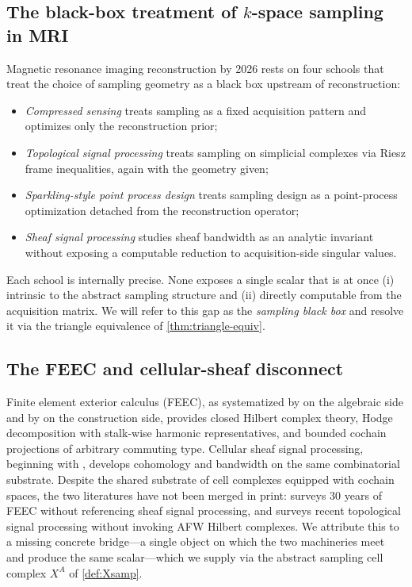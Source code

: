 \subsection{The black-box treatment of $k$-space sampling in MRI}\label{subsec:intro-mri-blackbox}

Magnetic resonance imaging reconstruction by 2026 rests on four
schools that treat the choice of sampling geometry as a black box
upstream of reconstruction:
\begin{itemize}[leftmargin=*]
\item \emph{Compressed sensing} \cite{LustigDonohoPauly2007} treats
  sampling as a fixed acquisition pattern and optimizes only the
  reconstruction prior;
\item \emph{Topological signal processing}
  \cite{BarbarossaSardellitti2020} treats sampling on simplicial
  complexes via Riesz frame inequalities, again with the geometry
  given;
\item \emph{Sparkling-style point process design}
  \cite{LazarusEtAl2019Sparkling} treats sampling design as a
  point-process optimization detached from the reconstruction
  operator;
\item \emph{Sheaf signal processing}
  \cite{Robinson2014,HansenGhrist2019,HansenGhrist2019Allerton}
  studies sheaf bandwidth as an analytic invariant without exposing a
  computable reduction to acquisition-side singular values.
\end{itemize}
Each school is internally precise. None exposes a single scalar
that is at once (i) intrinsic to the abstract sampling structure and
(ii) directly computable from the acquisition matrix. We will refer
to this gap as the \emph{sampling black box} and resolve it via the
triangle equivalence of \cref{thm:triangle-equiv}.

\subsection{The FEEC and cellular-sheaf disconnect}\label{subsec:intro-disconnect}

Finite element exterior calculus (FEEC), as systematized by
\cite{AFW2010,FalkWinther2014} on the algebraic side and by
\cite{BochevHyman2006,Christiansen2010} on the construction side,
provides closed Hilbert complex theory, Hodge decomposition with
stalk-wise harmonic representatives, and bounded cochain projections
of arbitrary commuting type. Cellular sheaf signal processing,
beginning with \cite{Robinson2014}, develops cohomology and bandwidth
on the same combinatorial substrate. Despite the shared substrate of
cell complexes equipped with cochain spaces, the two literatures have
not been merged in print: \cite{ChristiansenRapetti2025} surveys 30
years of FEEC without referencing sheaf signal processing, and
\cite{CerejeirasKahlerLegatiuk2025} surveys recent topological signal
processing without invoking AFW Hilbert complexes. We attribute this
to a missing concrete bridge---a single object on which the two
machineries meet and produce the same scalar---which we supply via
the abstract sampling cell complex $X^A$ of \cref{def:Xsamp}.

